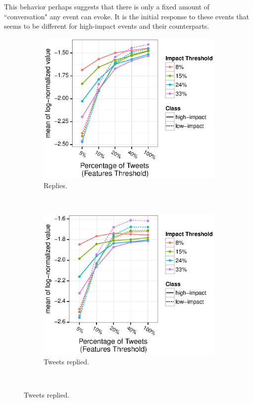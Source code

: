\documentclass[10pt,letterpaper]{article}
\begin{document}
This behavior perhaps suggests that there is only a fixed amount of
``conversation" any event can evoke. It is the initial response to
these events that seems to be different for high-impact events and
their counterparts.
\begin{figure}
  \centering
  \begin{subfigure}[b]{0.45\textwidth}
    \includegraphics[width=\textwidth]{figures_SI/Plots_from_data/total_replies2.eps}
    \caption{Replies.} \label{fig:feat_replies}
  \end{subfigure}
  ~ %
  \begin{subfigure}[b]{0.45\textwidth}
    \includegraphics[width=\textwidth]{figures_SI/Plots_from_data/total_tweets_replied.eps}
    \caption{Tweets replied.} \label{fig:feat_tweets_replied}
  \end{subfigure} ~ %


\end{figure}
\end{document}
